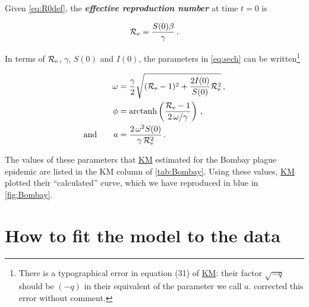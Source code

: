 \documentclass[]{interact}\usepackage[]{graphicx}\usepackage[]{xcolor}
\theoremstyle{plain}%
\theoremstyle{definition}
\theoremstyle{remark}
\newcommand{\term}[1]{{\bfseries\slshape#1}}
\newcommand{\R}{{\mathcal R}}
\newcommand{\Reff}{\R_{\rm e}}
\newcommand{\KM}{\protect\hyperlink{cite.KermMcKe27}{KM}\xspace}
\newcommand{\KMcol}{blue\xspace}  %
\newcommand{\Sinit}{S(0)}
\newcommand{\Iinit}{I(0)}
\begin{document}
Given \cref{eq:R0def}, the \term{effective reproduction number} at
time $t=0$ is
\begin{linenomath*}
\begin{equation}\label{eq:Reffdef}
\Reff = \frac{\Sinit\beta}{\gamma} \,.
\end{equation}
\end{linenomath*}
In terms of $\Reff$, $\gamma$, $\Sinit$ and $\Iinit$, the parameters
in \cref{eq:sech} can be written\footnote{There is a typographical
  error in equation (31) of \KM: their factor
  $\sqrt{-q}$ should be $(-q)$ in their equivalent of the parameter we
  call $a$.  \citet[\S3]{bacaermodel2012} corrected this error without
  comment.}
\begin{linenomath*}
\begin{subequations}\label{eq:sechparams}
\begin{align}
  \omega &= \frac{\gamma}{2} \sqrt{(\Reff-1)^2 +
           \frac{2\Iinit}{\Sinit}\Reff^2}\,, \label{eq:omega} \\
  \phi &= \textrm{arctanh}\left(\frac{\Reff - 1}{2\,\omega/\gamma}
         \right)\,, \label{eq:phi} \\
  \text{and}\qquad
  a &= \frac{2\,\omega^2 \Sinit}{\gamma\,\Reff^2} \label{eq:a} \,.
\end{align}
\end{subequations}
\end{linenomath*}
The values of these parameters that \KM estimated for the Bombay
plague epidemic are listed in the KM column of \cref{tab:Bombay}.
Using these values, \KM plotted their ``calculated'' curve, which we
have reproduced in \KMcol in \cref{fig:Bombay}.



\section{How to fit the model to the data}
\end{document}
